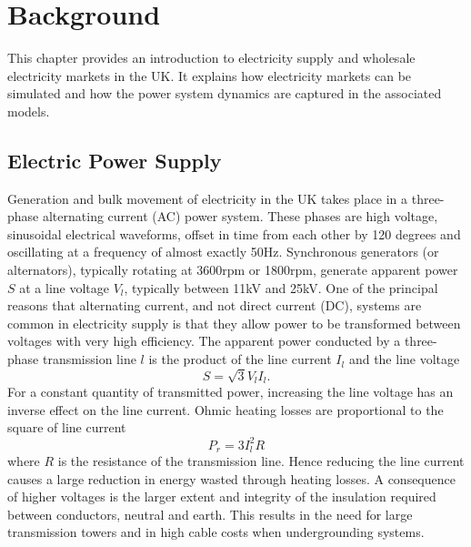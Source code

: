 \chapter{Background}
\label{ch:background}
This chapter provides an introduction to electricity supply and wholesale
electricity markets in the UK.  It explains how electricity markets can be
simulated and how the power system dynamics are captured in the associated
models.

\section{Electric Power Supply}



Generation and bulk movement of electricity in the UK takes place in a
three-phase alternating current (AC) power system.  These phases are
high voltage, sinusoidal electrical waveforms, offset in time from each
other by 120 degrees and oscillating at a frequency of almost exactly 50Hz.
Synchronous generators (or alternators), typically rotating at 3600rpm or
1800rpm, generate apparent power $S$ at a line voltage $V_l$, typically
between 11kV and 25kV.  One of the principal reasons that alternating current,
and not direct current (DC), systems are common in electricity supply is that
they allow power to be transformed between voltages with very high efficiency.
The apparent power conducted by a three-phase transmission line $l$ is the
product of the line current $I_l$ and the line voltage
\begin{equation}
S = \sqrt{3} V_l I_l .
\end{equation}
For a constant quantity of transmitted power, increasing the line voltage has
an inverse effect on the line current.  Ohmic heating losses are proportional to the
square of line current
\begin{equation}
P_{r} = 3 I_l^2 R
\end{equation}
where $R$ is the resistance of the transmission line.  Hence reducing the line
current causes a large reduction in energy wasted through heating losses.  A
consequence of higher voltages is the larger extent and integrity of the
insulation required between conductors, neutral and earth.  This results in
the need for large transmission towers and in high cable costs when
undergrounding systems.

